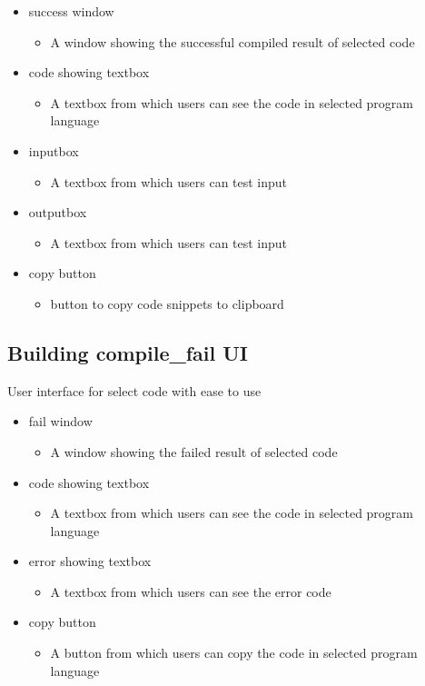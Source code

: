 \documentclass[conference]{IEEEtran}
\begin{document}
\begin{itemize}
  \item success window
  \begin{itemize}
    \item A window showing the successful compiled result of selected code
  \end{itemize}
  \item code showing textbox
  \begin{itemize}
    \item A textbox from which users can see the code in selected program language
  \end{itemize}
  \item inputbox
  \begin{itemize}
    \item A textbox from which users can test input
  \end{itemize}
  \item outputbox
  \begin{itemize}
    \item A textbox from which users can test input
  \end{itemize}
  \item copy button
  \begin{itemize}
    \item button to copy code snippets to clipboard
  \end{itemize}
\end{itemize}
\textit{ }


\subsection{Building compile\_fail UI}
 User interface for select code with ease to use

\begin{itemize}
  \item fail window
  \begin{itemize}
    \item A window showing the failed result of selected code
  \end{itemize}
  \item code showing textbox
  \begin{itemize}
    \item A textbox from which users can see the code in selected program language
  \end{itemize}
  \item error showing textbox
  \begin{itemize}
    \item A textbox from which users can see the error code
  \end{itemize}
  \item copy button
  \begin{itemize}
    \item A button from which users can copy the code in selected program language
  \end{itemize}
\end{itemize}
\textit{ }
\end{document}
